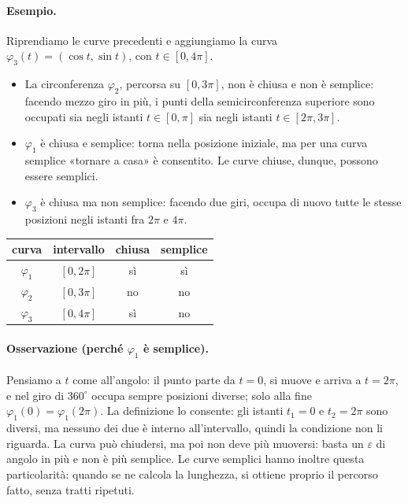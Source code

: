 \paragraph{Esempio.} Riprendiamo le curve precedenti e aggiungiamo la curva
$\varphi_3(t)=(\cos t,\sin t)$, con $t\in[0,4\pi]$.
\begin{itemize}
\item La circonferenza $\varphi_2$, percorsa su $[0,3\pi]$, non è chiusa e non è semplice:
facendo mezzo giro in più, i punti della semicirconferenza superiore sono occupati sia
negli istanti $t\in[0,\pi]$ sia negli istanti $t\in[2\pi,3\pi]$.
\item $\varphi_1$ è chiusa e semplice:
torna nella posizione iniziale, ma per una curva semplice «tornare a casa» è consentito.
Le curve chiuse, dunque, possono essere semplici.
\item $\varphi_3$ è chiusa ma non semplice:
facendo due giri, occupa di nuovo tutte le stesse posizioni negli istanti fra $2\pi$ e
$4\pi$.
\end{itemize}

\begin{center}
\begin{tabular}{cccc}
\hline
curva & intervallo & chiusa & semplice\\
\hline
$\varphi_1$ & $[0,2\pi]$ & sì & sì\\
$\varphi_2$ & $[0,3\pi]$ & no & no\\
$\varphi_3$ & $[0,4\pi]$ & sì & no\\
\hline
\end{tabular}
\end{center}

\paragraph{Osservazione (perché $\varphi_1$ è semplice).} Pensiamo a $t$ come all'angolo:
il punto parte da $t=0$, si muove e arriva a $t=2\pi$, e nel giro di $360^\circ$ occupa
sempre posizioni diverse; solo alla fine $\varphi_1(0)=\varphi_1(2\pi)$. La definizione
lo consente: gli istanti $t_1=0$ e $t_2=2\pi$ sono diversi, ma nessuno dei due è interno
all'intervallo, quindi la condizione non li riguarda.
La curva può chiudersi, ma poi non deve più muoversi: basta un $\varepsilon$ di angolo in
più e non è più semplice. Le curve semplici hanno inoltre questa particolarità: quando
se ne calcola la lunghezza, si ottiene proprio il percorso fatto, senza tratti ripetuti.

